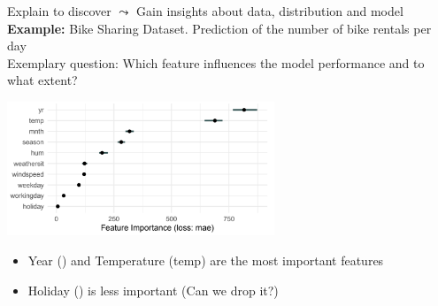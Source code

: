 \documentclass[11pt,compress,t,notes=noshow, aspectratio=169, xcolor=table]{beamer}
\begin{document}





\begin{frame}{Explain to discover}
$\leadsto$ Gain insights about data, distribution and model \\
\medskip
\textbf{Example:} Bike Sharing Dataset. Prediction of the number of bike rentals per day \\
Exemplary question: Which feature influences the model performance and to what extent?
\begin{center}
\includegraphics[width=0.6\textwidth]{figure/bike-sharing02.png}
\end{center}


\begin{itemize}
    \item Year () and Temperature (temp) are the most important features
    \item Holiday () is less important (Can we drop it?)
\end{itemize}

\end{frame}
\end{document}
